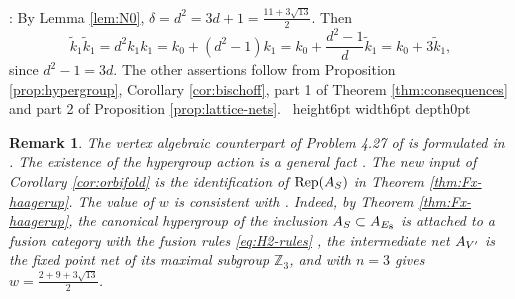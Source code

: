 \documentclass[leqno]{article}
\let\cal\relax
\newcommand{\cal}{\mathcal}
\newcommand{\Z}{\ensuremath{\mathbb{Z}}}
\newcommand{\qed}{\hfill \vrule height6pt  width6pt depth0pt}
\DeclareMathOperator{\Rep}{Rep} %
\newtheorem{remark}[thm]{Remark}
\newenvironment{proof}[1][]{\noindent {\it Proof #1} : }{\hbox{~}\qed
\smallskip
}
\numberwithin{equation}{section}
\begin{document}
\begin{proof}
By Lemma \ref{lem:N0}, $\delta = d^2 = 3d+1 = \frac{11+3\sqrt{13}}{2}$. Then
\[
\tilde k_1\tilde k_1 = d^2k_1k_1 = k_0+(d^2-1)k_1 = k_0+\frac{d^2-1}{d}\tilde k_1 = k_0+3\tilde k_1,
\]
since $d^2-1 = 3d$. The other assertions follow from Proposition \ref{prop:hypergroup}, Corollary \ref{cor:bischoff}, part 1 of Theorem \ref{thm:consequences} and part 2 of Proposition \ref{prop:lattice-nets}.
\end{proof}

\begin{remark}\normalfont
The vertex algebraic counterpart of Problem 4.27 of \cite{Bis17b} is formulated in \cite[Claim 4.4 and (4.54) p.~86]{GaR26}. The existence of the hypergroup action is a general fact \cite[Theorem 4.22 p.~24]{Bis17b}. The new input of Corollary \ref{cor:orbifold} is the identification of $\Rep(\cal A_S)$ in Theorem \ref{thm:Fx-haagerup}. The value of $w$ is consistent with \cite[Corollary 4.20 p.~23 and Lemma 4.26 p.~27]{Bis17b}. Indeed, by Theorem \ref{thm:Fx-haagerup}, the canonical hypergroup of the inclusion $\cal A_S \subset \cal A_{E_8}$ is attached to a fusion category with the fusion rules \eqref{eq:H2-rules} \cite[Theorem 5.16 p.~31]{Bis17b}, the intermediate net $\cal A_{V'}$ is the fixed point net of its maximal subgroup $\Z_3$, and \cite[Lemma 4.26 p.~27]{Bis17b} with $n = 3$ gives $w = \frac{2+9+3\sqrt{13}}{2}$.
\end{remark}
\end{document}
